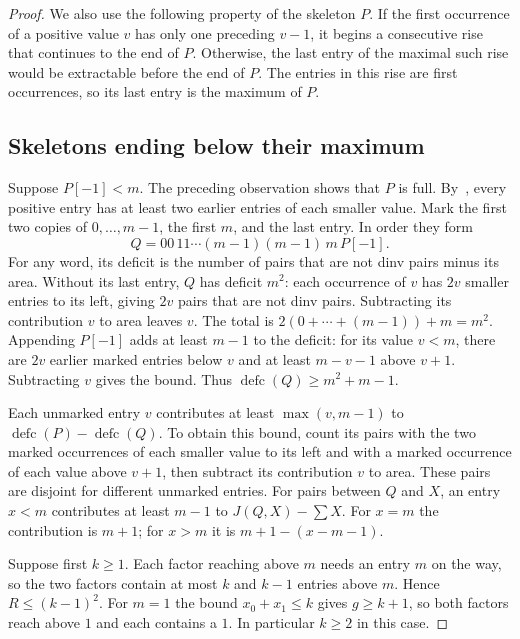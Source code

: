 \documentclass[11pt]{article}
\DeclareMathOperator{\defc}{defc}\DeclareMathOperator{\sym}{sym}
\begin{document}
\begin{proof}
We also use the following property of the skeleton $P$. If the first occurrence of a positive value $v$ has only one preceding $v-1$, it begins a consecutive rise that continues to the end of $P$. Otherwise, the last entry of the maximal such rise would be extractable before the end of $P$. The entries in this rise are first occurrences, so its last entry is the maximum of $P$.

\subsection*{Skeletons ending below their maximum}
Suppose $P[-1]<m$. The preceding observation shows that $P$ is full. By~\cite[Lemma~1.12]{H}, every positive entry has at least two earlier entries of each smaller value. Mark the first two copies of $0,\ldots,m-1$, the first $m$, and the last entry. In order they form
\[
 Q=00\,11\cdots(m-1)(m-1)\,m\,P[-1].
\]
For any word, its deficit is the number of pairs that are not dinv pairs minus its area. Without its last entry, $Q$ has deficit $m^2$: each occurrence of $v$ has $2v$ smaller entries to its left, giving $2v$ pairs that are not dinv pairs. Subtracting its contribution $v$ to area leaves $v$. The total is $2(0+\cdots+(m-1))+m=m^2$. Appending $P[-1]$ adds at least $m-1$ to the deficit: for its value $v<m$, there are $2v$ earlier marked entries below $v$ and at least $m-v-1$ above $v+1$. Subtracting $v$ gives the bound. Thus $\defc(Q)\ge m^2+m-1$.

Each unmarked entry $v$ contributes at least $\max(v,m-1)$ to $\defc(P)-\defc(Q)$. To obtain this bound, count its pairs with the two marked occurrences of each smaller value to its left and with a marked occurrence of each value above $v+1$, then subtract its contribution $v$ to area. These pairs are disjoint for different unmarked entries. For pairs between $Q$ and $X$, an entry $x<m$ contributes at least $m-1$ to $J(Q,X)-\sum X$. For $x=m$ the contribution is $m+1$; for $x>m$ it is $m+1-(x-m-1)$.

Suppose first $k\ge1$. Each factor reaching above $m$ needs an entry $m$ on the way, so the two factors contain at most $k$ and $k-1$ entries above $m$. Hence $R\le(k-1)^2$. For $m=1$ the bound $x_0+x_1\le k$ gives $g\ge k+1$, so both factors reach above $1$ and each contains a $1$. In particular $k\ge2$ in this case.


\end{proof}
\end{document}
